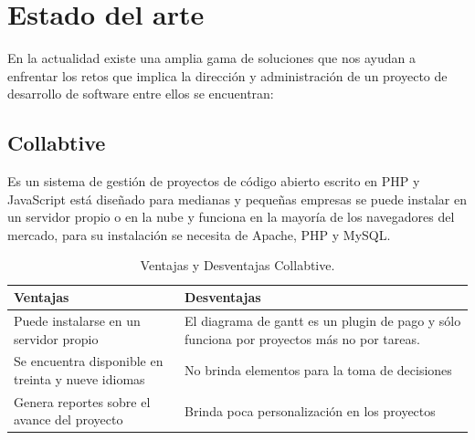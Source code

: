 \section{Estado del arte}

En la actualidad existe una amplia gama de soluciones que nos ayudan a enfrentar los retos que implica la dirección y administración de un proyecto de desarrollo de software entre ellos se encuentran:  
\newline \newline
\subsection{Collabtive}  
Es un sistema de gestión de proyectos de código abierto escrito en PHP y JavaScript está diseñado para medianas y pequeñas empresas se puede instalar en un servidor propio o en la nube y funciona en la mayoría de los navegadores del mercado, para su instalación se necesita de Apache, PHP y MySQL.\cite{P.Kiszka}
\newline \newline
\begin{table}[htbp]
\begin{center}
\begin{tabular}{|p{85mm}|p{85mm}|}
\hline
Ventajas & Desventajas 
\\
\hline \hline
Puede instalarse en un servidor propio & El diagrama de gantt es un plugin de pago y sólo funciona por proyectos más no por tareas. 
\\ \hline
Se encuentra disponible en treinta y nueve idiomas & No brinda elementos para la toma de decisiones 
\\ \hline
Genera reportes sobre el avance del proyecto & Brinda poca personalización en los proyectos 
\\ \hline
\end{tabular}
\caption{Ventajas y Desventajas Collabtive.}
\label{tabla:ventajas}
\end{center}
\end{table}
